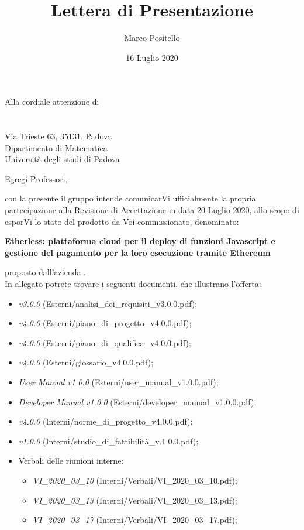 \documentclass[a4paper]{letter}
\title{Lettera di Presentazione}
\author{Marco Positello}
\begin{document}
\begin{letter} {Alla cordiale attenzione di \\ \TV \\ \RC \\ Via Trieste 63, 35131, Padova\\ Dipartimento di Matematica \\ Università degli studi di Padova }
  \vspace*{-0.4\baselineskip}
\date{16 Luglio 2020}
\opening{Egregi Professori,}
con la presente il gruppo \Gruppo{} intende comunicarVi ufficialmente la propria partecipazione alla Revisione di Accettazione in data 20 Luglio 2020, allo scopo di esporVi lo stato del prodotto da Voi commissionato, denominato:
  \begin{center}
    \textbf{Etherless: piattaforma cloud per il deploy di funzioni Javascript e gestione del pagamento per la loro esecuzione tramite Ethereum}
  \end{center}
  proposto dall'azienda \Proponente.\\
  In allegato potrete trovare i seguenti documenti, che illustrano l'offerta:
  \begin{itemize}
    \item \AdR{} \textit{v3.0.0} (Esterni/analisi\_dei\_requisiti\_v3.0.0.pdf);
    \item \PdP{} \textit{v4.0.0} (Esterni/piano\_di\_progetto\_v4.0.0.pdf);
    \item \PdQ{} \textit{v4.0.0} (Esterni/piano\_di\_qualifica\_v4.0.0.pdf);
    \item \Glossario{} \textit{v4.0.0} (Esterni/glossario\_v4.0.0.pdf);
		\item \textit{User Manual v1.0.0} (Esterni/user\_manual\_v1.0.0.pdf);
		\item \textit{Developer Manual v1.0.0} (Esterni/developer\_manual\_v1.0.0.pdf);
    \item \NdP{} \textit{v4.0.0} (Interni/norme\_di\_progetto\_v4.0.0.pdf);
    \item \SdF{} \textit{v1.0.0} (Interni/studio\_di\_fattibilità\_v.1.0.0.pdf);
    \item Verbali delle riunioni interne:
      \begin{itemize}
      				\item \textit{VI\_2020\_03\_10} (Interni/Verbali/VI\_2020\_03\_10.pdf);
				\item \textit{VI\_2020\_03\_13} (Interni/Verbali/VI\_2020\_03\_13.pdf);
				\item \textit{VI\_2020\_03\_17} (Interni/Verbali/VI\_2020\_03\_17.pdf);

\end{itemize}
\end{itemize}
\end{letter}
\end{document}
